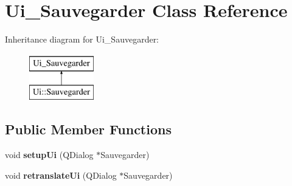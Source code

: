 \hypertarget{class_ui___sauvegarder}{\section{Ui\-\_\-\-Sauvegarder Class Reference}
\label{class_ui___sauvegarder}
}
Inheritance diagram for Ui\-\_\-\-Sauvegarder\-:\begin{figure}[H]
\begin{center}
\leavevmode
\includegraphics[height=2.000000cm]{class_ui___sauvegarder}
\end{center}
\end{figure}
\subsection*{Public Member Functions}
\begin{DoxyCompactItemize}
\item 
\hypertarget{class_ui___sauvegarder_a500013becedcf8710c080f8031cbfa91}{void {\bfseries setup\-Ui} (Q\-Dialog $\ast$Sauvegarder)}\label{class_ui___sauvegarder_a500013becedcf8710c080f8031cbfa91}

\item 
\hypertarget{class_ui___sauvegarder_a2bc269d6baf3a80f516fea255a470de0}{void {\bfseries retranslate\-Ui} (Q\-Dialog $\ast$Sauvegarder)}\label{class_ui___sauvegarder_a2bc269d6baf3a80f516fea255a470de0}

\end{DoxyCompactItemize}
